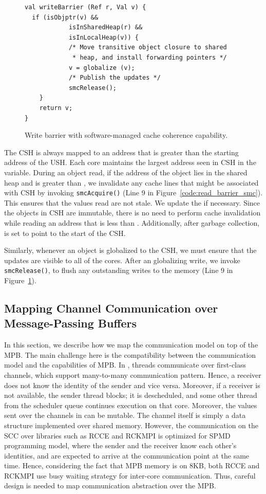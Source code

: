\begin{figure}
\begin{lstlisting}
val writeBarrier (Ref r, Val v) {
  if (isObjptr(v) &&
			isInSharedHeap(r) &&
			isInLocalHeap(v)) {
			/* Move transitive object closure to shared
			 * heap, and install forwarding pointers */
			v = globalize (v);
			/* Publish the updates */
			smcRelease();
	}
	return v;
}
\end{lstlisting}
\caption{Write barrier with software-managed cache coherence capability.}
\label{code:write_barrier_smc}
\end{figure}


The CSH is always mapped to an address that is greater than the starting
address of the USH. Each core maintains the largest address seen in CSH in the
 variable. During an object read, if the address of the
object lies in the shared heap and is greater than , we
invalidate any cache lines that might be associated with CSH by invoking
\texttt{smcAcquire()} (Line 9 in Figure~\ref{code:read_barrier_smc}). This
ensures that the values read are not stale. We update the 
if necessary. Since the objects in CSH are immutable, there is no need to
perform cache invalidation while reading an address that is less than
. Additionally, after garbage collection,
 is set to point to the start of the CSH.

Similarly, whenever an object is globalized to the CSH, we must ensure that the
updates are visible to all of the cores. After an globalizing write, we invoke
\texttt{smcRelease()}, to flush any outstanding writes to the memory (Line 9 in
Figure~\ref{code:write_barrier_smc}).

\subsection{Mapping Channel Communication over Message-Passing Buffers}
\label{sec:comm_opt}

In this section, we describe how we map the \MM communication model on top of
the MPB. The main challenge here is the compatibility between the \MM
communication model and the capabilities of MPB. In \MM, threads communicate
over first-class channels, which support many-to-many communication pattern.
Hence, a receiver does not know the identity of the sender and vice versa.
Moreover, if a receiver is not available, the sender thread blocks; it is
descheduled, and some other thread from the scheduler queue continues execution
on that core. Moreover, the values sent over the channels in \MM can be
mutable. The channel itself is simply a data structure implemented over shared
memory. However, the communication on the SCC over libraries such as RCCE and
RCKMPI is optimized for SPMD programming model, where the sender and the
receiver know each other's identities, and are expected to arrive at the
communication point at the same time. Hence, considering the fact that MPB
memory is on 8KB, both RCCE and RCKMPI use busy waiting strategy for inter-core
communication. Thus, careful design is needed to map \MM communication
abstraction over the MPB.

